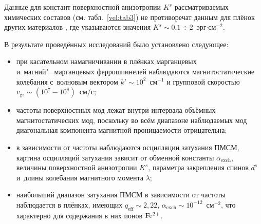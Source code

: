 Данные для констант поверхностной анизотропии $K^s$  рассматриваемых химических составов (см. табл.~\ref{vel:tab3}) не противоречат данным для плёнок других материалов \cite{velik:M10}, где указываются значения $K^s \sim 0.1\div2$~эрг$\cdot$см$^{-2}$.



\smallskip




  В результате проведённых исследований было установлено следующее:

\begin{itemize}

\item[--] при касательном намагничивании в плёнках марганцевых и~магний"=марганцевых феррошпинелей наблюдаются магнитостатические колебания с~волновым вектором $k'\sim10^2$~см$^{-1}$ и групповой скоростью $v_{\text{gr}}\sim (10^{7}-10^{8})$~см/с; 



\item[--] частоты поверхностных мод лежат внутри интервала объёмных магнитостатических мод, поскольку во всём диапазоне наблюдаемых мод диагональная компонента магнитной проницаемости отрицательна; 

\item[--] в зависимости от частоты наблюдаются осцилляции затухания ПМСМ, картина осцилляций затухания зависит от обменной константы $\alpha_\text{exch}$, величины поверхностной анизотропии $K^s$, параметра закрепления спинов $d^s$ и~длины колебания магнитного момента $\lambda$;



\item[--] наибольший диапазон затухания ПМСМ в зависимости от  частоты наблюдается в плёнках, имеющих $q_\text{eff} \sim 2,22$, $\alpha_\text{exch} \sim  10^{-12}$~см$^{-2}$,  что характерно для содержания в них ионов  $\rm Fe^{2+}$.



\end{itemize}



